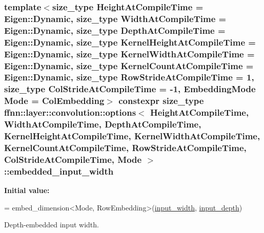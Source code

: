 \hypertarget{structffnn_1_1layer_1_1convolution_1_1options_acd86e19ee6b983f31612e91f924abefa}{
\subsubsection[{embedded\-\_\-input\-\_\-width}]{\setlength{\rightskip}{0pt plus 5cm}template$<$size\-\_\-type Height\-At\-Compile\-Time = Eigen\-::\-Dynamic, size\-\_\-type Width\-At\-Compile\-Time = Eigen\-::\-Dynamic, size\-\_\-type Depth\-At\-Compile\-Time = Eigen\-::\-Dynamic, size\-\_\-type Kernel\-Height\-At\-Compile\-Time = Eigen\-::\-Dynamic, size\-\_\-type Kernel\-Width\-At\-Compile\-Time = Eigen\-::\-Dynamic, size\-\_\-type Kernel\-Count\-At\-Compile\-Time = Eigen\-::\-Dynamic, size\-\_\-type Row\-Stride\-At\-Compile\-Time = 1, size\-\_\-type Col\-Stride\-At\-Compile\-Time = -\/1, Embedding\-Mode Mode = Col\-Embedding$>$ constexpr {\bf size\-\_\-type} {\bf ffnn\-::layer\-::convolution\-::options}$<$ Height\-At\-Compile\-Time, Width\-At\-Compile\-Time, Depth\-At\-Compile\-Time, Kernel\-Height\-At\-Compile\-Time, Kernel\-Width\-At\-Compile\-Time, Kernel\-Count\-At\-Compile\-Time, Row\-Stride\-At\-Compile\-Time, Col\-Stride\-At\-Compile\-Time, Mode $>$\-::embedded\-\_\-input\-\_\-width\hspace{0.3cm}{\ttfamily [static]}}}\label{structffnn_1_1layer_1_1convolution_1_1options_acd86e19ee6b983f31612e91f924abefa}
{\bfseries Initial value\-:}
\begin{DoxyCode}
=
    embed\_dimension<Mode, RowEmbedding>(\hyperlink{structffnn_1_1layer_1_1convolution_1_1options_a17abc9ea9d41cf399fbeae5e3f7580f4}{input\_width},  \hyperlink{structffnn_1_1layer_1_1convolution_1_1options_a5c928d8733be98927ccd22d009739deb}{input\_depth})
\end{DoxyCode}


Depth-\/embedded input width. 

